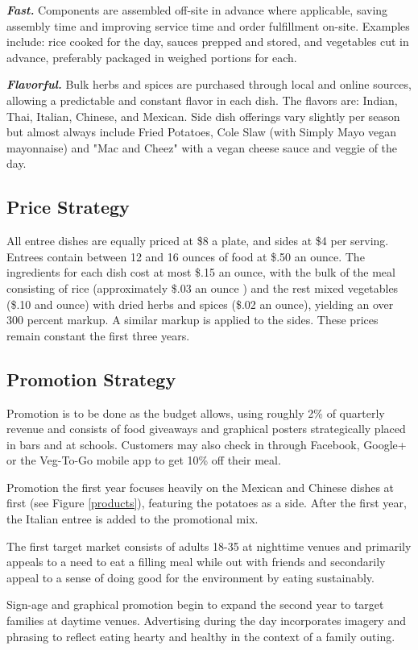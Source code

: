 \documentclass[12pt, letterpaper]{article}
\begin{document}
\textbf{\emph{Fast.}} Components are assembled off-site in advance where applicable, saving assembly time and improving service time and order fulfillment on-site. Examples include: rice cooked for the day, sauces prepped and stored, and vegetables cut in advance, preferably packaged in weighed portions for each. 

\textbf{\emph{Flavorful.}} Bulk herbs and spices are purchased through local and online sources, allowing a predictable and constant flavor in each dish.  The flavors are: Indian, Thai, Italian, Chinese, and Mexican. Side dish offerings vary slightly per season but almost always include Fried Potatoes, Cole Slaw (with Simply Mayo\textregistered{} vegan mayonnaise) and "Mac and Cheez" with a vegan cheese sauce and veggie of the day.
\subsection{Price Strategy}
All entree dishes are equally priced at \$8 a plate, and sides at \$4 per serving. Entrees contain between 12 and 16 ounces of food at \$.50 an ounce. The ingredients for each dish cost at most \$.15 an ounce, with the bulk of the meal consisting of rice (approximately \$.03 an ounce \cite{costs}) and the rest mixed vegetables (\$.10 and ounce) with dried herbs and spices (\$.02 an ounce), yielding an over 300 percent markup. A similar markup is applied to the sides.  These prices remain constant the first three years.
\subsection{Promotion Strategy}
Promotion is to be done as the budget allows, using roughly 2\% of quarterly revenue and consists of food giveaways and graphical posters strategically placed in bars and at schools.  Customers may also check in through Facebook, Google+ or the Veg-To-Go mobile app to get 10\% off their meal.

Promotion the first year focuses heavily on the Mexican and Chinese dishes at first (see Figure \ref{products}), featuring the potatoes as a side. After the first year, the Italian entree is added to the promotional mix.

The first target market consists of adults 18-35 at nighttime venues and primarily appeals to a need to eat a filling meal while out with friends and secondarily appeal to a sense of doing good for the environment by eating sustainably.

Sign-age and graphical promotion begin to expand the second year to target families at daytime venues.  Advertising during the day incorporates imagery and phrasing to reflect eating hearty and healthy in the context of a family outing.
\end{document}
